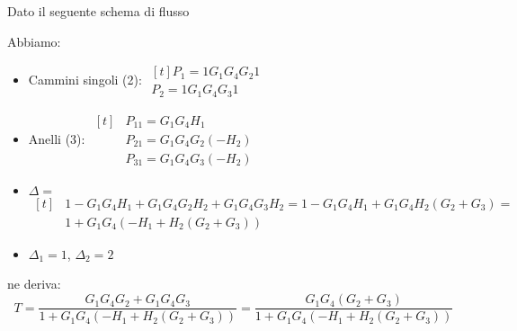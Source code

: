 \begin{nexample} Dato il seguente schema di flusso
	
	\begin{center}
		
	\end{center}
	Abbiamo:
	\begin{itemize}
		\item Cammini singoli (2):
		$\begin{aligned}[t]
			P_1 = 1 G_1 G_4 G_2 1 \\ P_2 = 1 G_1 G_4 G_3 1 
		\end{aligned}$
		\item Anelli (3):  
		$\begin{aligned}[t]
			&P_{11} = G_1 G_4 H_1\\&P_{21} = G_1 G_4 G_2 (-H_2)\\&P_{31} = G_1 G_4 G_3 (-H_2)
		\end{aligned}$
		
		\item$ \Delta =$
		$\begin{aligned}[t] 
		&1-G_1G_4H_1+G_1G_4G_2H_2+G_1G_4G_3H_2 = 1-G_1 G_4 H_1 +G_1 G_4 H_2(G_2 + G_3) =\\& 1+G_1 G_4 (-H_1 + H_2(G_2 + G_3))
		\end{aligned}$
		\item$ \Delta_1 = 1 $, $ \Delta_2 = 2 $
	\end{itemize}
ne deriva:
\begin{equation*}
	T=\frac{G_1 G_4 G_2 + G_1 G_4 G_3}{1+G_1 G_4 (-H_1 + H_2(G_2 + G_3))}=\frac{G_1 G_4 (G_2 + G_3)}{1+G_1 G_4 (-H_1 + H_2(G_2 + G_3))}
\end{equation*}
\end{nexample}
	
	

